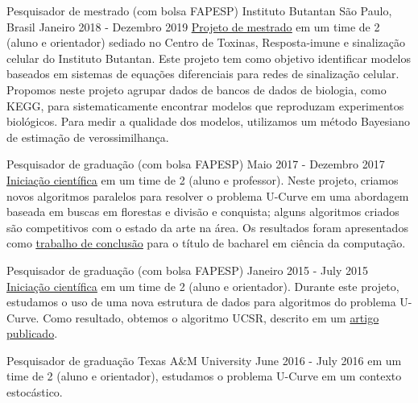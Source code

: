 \documentclass[11pt, a4paper]{awesome-cv-res}
\begin{document}
\begin{cventries}
\cventry
{Pesquisador de mestrado (com bolsa FAPESP)}
{Instituto Butantan}
{São Paulo, Brasil}
{Janeiro 2018 - Dezembro 2019}
{\href{https://bv.fapesp.br/en/bolsas/175684/identification-of-cell-signaling-pathways-based-on-biochemical-reaction-kinetics-repositories/}
{\color{awesome}\underline {Projeto de mestrado}} em um time de 2 
    (aluno e orientador) sediado no Centro de Toxinas, Resposta-imune
    e sinalização celular do Instituto Butantan. Este projeto tem como
    objetivo identificar modelos baseados em sistemas de equações 
    diferenciais para redes de sinalização celular. Propomos neste
    projeto agrupar dados de bancos de dados de biologia, como KEGG,
    para sistematicamente encontrar modelos que reproduzam experimentos
    biológicos. Para medir a qualidade dos modelos, utilizamos um 
    método Bayesiano de estimação de verossimilhança.}

\cventry
{Pesquisador de graduação (com bolsa FAPESP)}
{}
{}
{Maio 2017 - Dezembro 2017}
{\href{https://bv.fapesp.br/en/bolsas/170553/design-of-poset-forest-based-algorithms-for-the-u-curve-optimization-problem/}
{\color{awesome} \underline{Iniciação científica}} em um time de 2
    (aluno e professor). Neste projeto, criamos novos algoritmos 
    paralelos para resolver o problema U-Curve em uma abordagem baseada
    em buscas em florestas e divisão e conquista; alguns algoritmos
    criados são competitivos com o estado da arte na área. Os resultados
    foram apresentados como 
    \href{http://linux.ime.usp.br/~gustavoem/mac0499}
    {\color{awesome} \underline{trabalho de conclusão}} para o título
    de bacharel em ciência da computação.}

\cventry
{Pesquisador de graduação (com bolsa FAPESP)}
{}
{}
{Janeiro 2015 - July 2015}
{\href{https://bv.fapesp.br/en/bolsas/156441/studies-of-efficient-data-structures-to-tackle-the-u-curve-optimization-problem/}
{\color{awesome} \underline{Iniciação científica}} em um time de 2 
    (aluno e orientador). Durante este projeto, estudamos o uso de uma
    nova estrutura de dados para algoritmos do problema U-Curve. Como
    resultado, obtemos o algoritmo UCSR, descrito em um \href{https://www.sciencedirect.com/science/article/pii/S0020025518306789?via\%3Dihub}
    {artigo publicado}.
}


\cventry
{Pesquisador de graduação}
{Texas A\&M University}
{}
{June 2016 - July 2016}
{em um time de 2 (aluno e orientador), estudamos o problema U-Curve
    em um contexto estocástico.}
\end{cventries}
\end{document}
